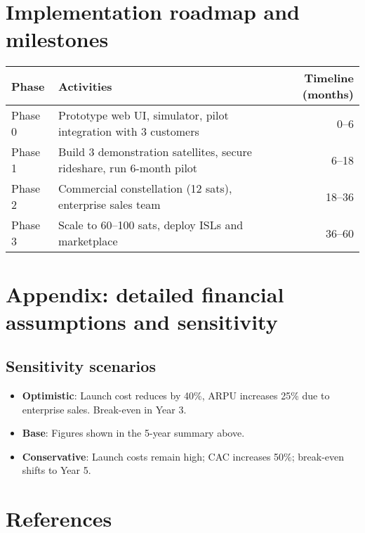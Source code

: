 \section{Implementation roadmap and milestones}
\begin{tabularx}{\textwidth}{l X r}
\toprule
Phase & Activities & Timeline (months) \\
\midrule
Phase 0 & Prototype web UI, simulator, pilot integration with 3 customers & 0--6 \\
Phase 1 & Build 3 demonstration satellites, secure rideshare, run 6-month pilot & 6--18 \\
Phase 2 & Commercial constellation (12 sats), enterprise sales team & 18--36 \\
Phase 3 & Scale to 60--100 sats, deploy ISLs and marketplace & 36--60 \\
\bottomrule
\end{tabularx}

\section{Appendix: detailed financial assumptions and sensitivity}
\subsection{Sensitivity scenarios}
\begin{itemize}
  \item \textbf{Optimistic}: Launch cost reduces by 40\%, ARPU increases 25\% due to enterprise sales. Break-even in Year 3.
  \item \textbf{Base}: Figures shown in the 5-year summary above.
  \item \textbf{Conservative}: Launch costs remain high; CAC increases 50\%; break-even shifts to Year 5.
\end{itemize}

\section{References}
\nocite{*}
\printbibliography


